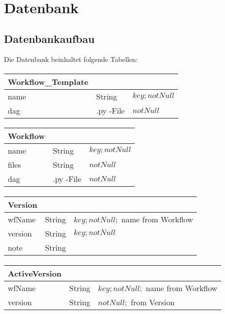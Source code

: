 \section{Datenbank}

\subsection{Datenbankaufbau}
Die Datenbank beinhaltet folgende Tabellen:

\paragraph{}
\begin{tabular}{|p{4cm}|p{2cm}|p{6cm}|}
	\hline
	\textbf{Workflow\_Template} &  & \\
	\hline
	name & String & $key; notNull$ \\
	\hline
	dag & .py -File & $notNull$\\
	\hline
\end{tabular}

\paragraph{}
\begin{tabular}{|p{4cm}|p{2cm}|p{6cm}|}
	\hline
	\textbf{Workflow} &  & \\
	\hline
	name & String & $key; notNull$ \\
	\hline
	files & String & $notNull$ \\
	\hline
	dag & .py  -File & $notNull$\\
	\hline
\end{tabular}

\paragraph{}
\begin{tabular}{|p{4cm}|p{2cm}|p{6cm}|}
	\hline
	\textbf{Version} & & \\
	\hline
	wfName & String & $key; notNull;$ name from Workflow\\
	\hline
	version & String & $key; notNull$ \\
	\hline
	note & String & \\
	\hline
\end{tabular}

\paragraph{}
\begin{tabular}{|p{4cm}|p{2cm}|p{6cm}|}
	\hline
	\textbf{ActiveVersion} & & \\
	\hline
	wfName & String & $key; notNull;$ name from Workflow\\
	\hline
	version & String & $notNull;$ from Version\\
	\hline
\end{tabular}

